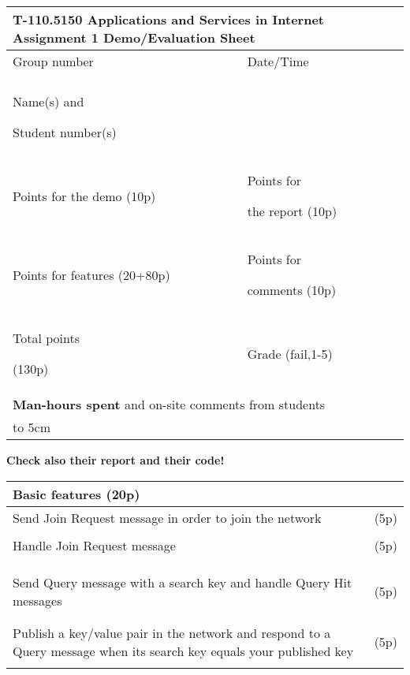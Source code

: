\documentclass[12pt, a4paper]{article}
\begin{document}
\begin{center}
\begin{tabular}{|p{3.8cm}|p{3.8cm}|p{3.8cm}|p{3.8cm}|}
\multicolumn{4}{l}{T-110.5150 Applications and Services in Internet Assignment 1 Demo/Evaluation Sheet}\\
\hline
Group number & & Date/Time & \\
& & & \\
\hline
Name(s) and\par Student number(s) & \multicolumn{3}{l|}{}\\
\hline
Points for the demo (10p)& & Points for\par the report (10p) & \\
\hline
Points for features (20+80p)& & Points for\par comments (10p) & \\
\hline
Total points\par (130p) & & Grade (fail,1-5) & \\
\hline
\multicolumn{4}{|l|}{\textbf{Man-hours spent} and on-site comments from students}\\
\hline
\multicolumn{4}{|l|}{\vbox to 5cm {}}\\
\hline
\end{tabular}
\end{center}

\vskip 20pt

\noindent
\textbf{Check also their report and their code!}

\vskip 20pt

\begin{center}
\begin{tabular}{|p{6cm}|p{10cm}|}
\multicolumn{2}{l}{Basic features (20p)}\\
\hline
Send Join Request message in order to join the network & (5p) \\
&\\
\hline
Handle Join Request message & (5p)\\
&\\
&\\
&\\
\hline
Send Query message with a search key and handle Query Hit messages & (5p)  \\
&\\
&\\
\hline
Publish a key/value pair in the network and respond to a Query message when its search key equals your published key & (5p) \\
&\\
\hline
\end{tabular}
\end{center}
\end{document}
